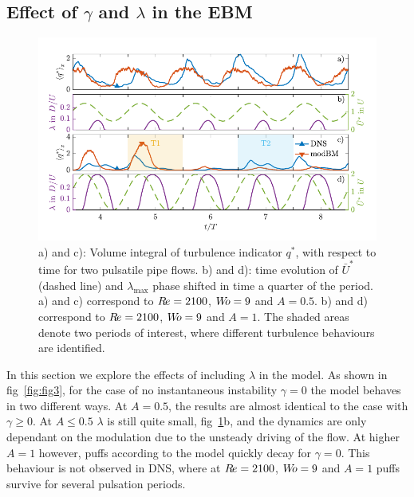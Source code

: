 \documentclass{article}
\DeclareRobustCommand{\Reynolds}{\ensuremath{R\hspace{-0.1em}e}\xspace}     %
\DeclareRobustCommand{\Womersley}{\ensuremath{W\hspace{-0.25em}o}\xspace}    %
\DeclareRobustCommand{\Amplitude}{\ensuremath{A}\xspace}    %
\begin{document}
\subsection{Effect of $\gamma$ and $\lambda$ in the EBM}
\begin{figure}
\centering
\includegraphics[width=\textwidth, trim=0mm 0mm 0mm 0mm, clip=true]{Figures9/Fig4.pdf}
\caption{a) and c): Volume integral of turbulence indicator $q^{*}$, with respect to time for two pulsatile pipe flows. b) and d): time evolution of $\bar{U}^{*}$ (dashed line) and $\lambda_{\max}$ phase shifted in time a quarter of the period. a) and c) correspond to $\Reynolds=2100$, $\Womersley=9$ and $\Amplitude=0.5$. b) and d) correspond to $\Reynolds=2100$, $\Womersley=9$ and $\Amplitude=1$. The shaded areas denote two periods of interest, where different turbulence behaviours are identified.}
\label{fig:fig4}
\end{figure}

In this section we explore the effects of including $\lambda$ in the model. As shown in fig~\ref{fig:fig3}, for the case of no instantaneous instability $\gamma=0$ the model behaves in two different ways. At $\Amplitude=0.5$, the results are almost identical to the case with $\gamma \geq 0$. At $\Amplitude \leq 0.5$ $\lambda$ is still quite small, fig~\ref{fig:fig4}b, and the dynamics are only dependant on the modulation due to the unsteady driving of the flow. At higher $\Amplitude=1$ however, puffs according to the model quickly decay for $\gamma=0$. This behaviour is not observed in DNS, where at $\Reynolds=2100$, $\Womersley=9$ and $\Amplitude=1$ puffs survive for several pulsation periods.
\end{document}
